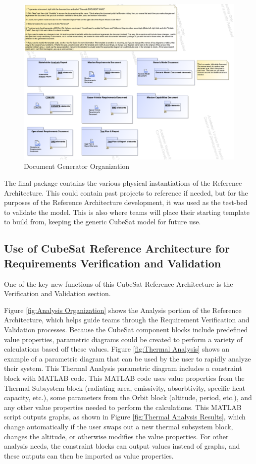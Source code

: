 \documentclass[conference]{joss-pretty}
\begin{document}
\begin{figure}
    \centering
    \includegraphics[width=\textwidth]{Figures/Document Generator Organization.png}
    \caption{Document Generator Organization}
    \label{fig:Document Generator Organization}
\end{figure}


The final package contains the various physical instantiations of the Reference Architecture. This could contain past projects to reference if needed, but for the purposes of the Reference Architecture development, it was used as the test-bed to validate the model. This is also where teams will place their starting template to build from, keeping the generic CubeSat model for future use. 


\subsection{Use of CubeSat Reference Architecture for Requirements Verification and Validation}
One of the key new functions of this CubeSat Reference Architecture is the Verification and Validation section. 

Figure \ref{fig:Analysis Organization} shows the Analysis portion of the Reference Architecture, which helps guide teams through the Requirement Verification and Validation processes. Because the CubeSat component blocks include predefined value properties, parametric diagrams could be created to perform a variety of calculations based off these values. Figure \ref{fig:Thermal Analysis} shows an example of a parametric diagram that can be used by the user to rapidly analyze their system. This Thermal Analysis parametric diagram includes a constraint block with MATLAB code. This MATLAB code uses value properties from the Thermal Subsystem block (radiating area, emissivity, absorbtivity, specific heat capacity, etc.), some parameters from the Orbit block (altitude, period, etc.), and any other value properties needed to perform the calculations. This MATLAB script outputs graphs, as shown in Figure \ref{fig:Thermal Analysis Results}, which change automatically if the user swaps out a new thermal subsystem block, changes the altitude, or otherwise modifies the value properties. For other analysis needs, the constraint blocks can output values instead of graphs, and these outputs can then be imported as value properties. 
\end{document}
